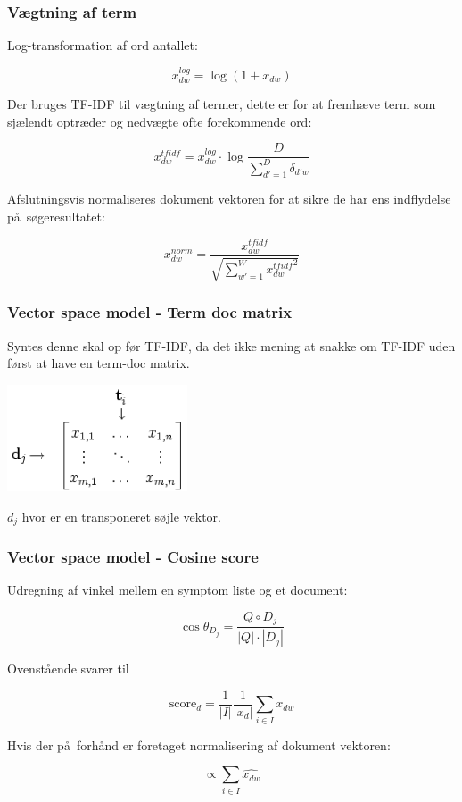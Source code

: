 \documentclass[xcolor=table]{beamer}
\begin{document}
\begin{frame}

  \frametitle{V\ae gtning af term}

  Log-transformation af ord antallet:

  \[
  x_{dw}^{log} = \log{(1 + x_{dw})}
  \]

  Der bruges TF-IDF til v\ae gtning af termer, dette er for at fremh\ae ve term som sj\ae lendt optr\ae der og nedv\ae gte ofte forekommende ord:

  \[
  x_{dw}^{tfidf} = x_{dw}^{log} \cdot \log{\frac{D}{\sum_{d\prime = 1}^{D}\delta_{d\prime w}}}
  \]

  Afslutningsvis normaliseres dokument vektoren for at sikre de har ens indflydelse p\aa\ s\o geresultatet:

  \[
  x_{dw}^{norm} = \frac{x_{dw}^{tfidf}}{\sqrt{\sum_{w\prime = 1}^{W} {x_{dw}^{tfidf}}^{2}}}
  \]

\end{frame}

\begin{frame}

  \frametitle{Vector space model - Term doc matrix}

  Syntes denne skal op f\o r TF-IDF, da det ikke mening at snakke om
  TF-IDF uden f\o rst at have en term-doc matrix.

  \begin{center}
    \includegraphics[width=0.40\textwidth]{diagram/termdoc}
  \end{center}

  $d_j$ hvor er en transponeret s\o jle vektor.

\end{frame}

\begin{frame}

  \frametitle{Vector space model - Cosine score}

  Udregning af vinkel mellem en symptom liste og et document:
  
  \[
  \cos \theta_{D_j} = \frac{Q \circ D_j}{|Q| \cdot |D_j|}
  \]
  
  Ovenst\aa ende svarer til
  
  \[
  \textrm{score}_{d} = \frac{1}{|I|}\frac{1}{|x_{d}|} \sum_{i \in I} x_{dw}
  \]
  
  Hvis der p\aa\ forh\aa nd er foretaget normalisering af dokument vektoren:
  
  \[
  \propto  \sum_{i \in I} \widehat{x_{dw}}
  \]
  
\end{frame}
\end{document}
